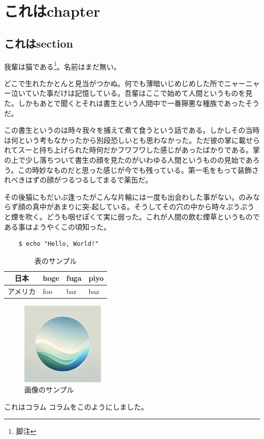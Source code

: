 \documentclass[b5paper]{ltjsbook}
\begin{document}
\chapter{これはchapter}
\section{これはsection}
我輩は猫である\footnote{脚注}。名前はまだ無い。

どこで生れたかとんと見当がつかぬ。何でも薄暗いじめじめした所でニャーニャー泣いていた事だけは記憶している。吾輩はここで始めて人間というものを見た。しかもあとで聞くとそれは書生という人間中で一番獰悪な種族であったそうだ。

この書生というのは時々我々を捕えて煮て食うという話である。しかしその当時は何という考もなかったから別段恐しいとも思わなかった。ただ彼の掌に載せられてスーと持ち上げられた時何だかフワフワした感じがあったばかりである。掌の上で少し落ちついて書生の顔を見たのがいわゆる人間というものの見始であろう。この時妙なものだと思った感じが今でも残っている。第一毛をもって装飾されべきはずの顔がつるつるしてまるで薬缶だ。

その後猫にもだいぶ逢ったがこんな片輪には一度も出会わした事がない。のみならず顔の真中があまりに突-起している。そうしてその穴の中から時々ぷうぷうと煙を吹く。どうも咽せぽくて実に弱った。これが人間の飲む煙草というものである事はようやくこの頃知った。


\begin{alltt}
  \begin{verbatim}
    $ echo "Hello, World!"
  \end{verbatim}
\end{alltt}
  

\begin{table}[ht]
  \centering
  \caption{表のサンプル}
  \begin{tabular}{|c|l|l|l|} \hline
    日本 & hoge & fuga & piyo \\ \hline
    アメリカ & foo & bar & baz \\ \hline
  \end{tabular}
  \label{table-sample}
\end{table}

\begin{figure}[ht]
  \centering
  \includegraphics[width=4cm]{../res/image.jpg}
  \caption{画像のサンプル}
  \label{figure-sample}
\end{figure}

\begin{note}{これはコラム}
  コラムをこのようにしました。
\end{note}
\end{document}
